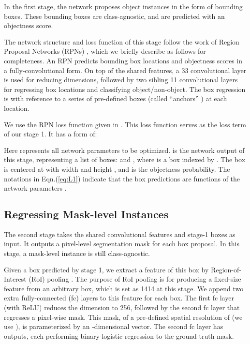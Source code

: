 \documentclass[10pt,twocolumn,letterpaper]{article}
\begin{document}
In the first stage, the network proposes object instances in the form of bounding boxes. These bounding boxes are class-agnostic, and are predicted with an objectness score.

The network structure and loss function of this stage follow the work of Region Proposal Networks (RPNs) \cite{Ren2015}, which we briefly describe as follows for completeness. An RPN predicts bounding box locations and objectness scores in a fully-convolutional form. On top of the shared features, a 33 convolutional layer is used for reducing dimensions, followed by two sibling 11 convolutional layers for regressing box locations and classifying object/non-object. The box regression is with reference to a series of pre-defined boxes (called ``anchors'' \cite{Ren2015}) at each location.

We use the RPN loss function given in \cite{Ren2015}. This loss function serves as the loss term  of our stage 1.
It has a form of:

Here  represents all network parameters to be optimized.  is the network output of this stage, representing a list of boxes:  and , where  is a box indexed by . The box  is centered at  with width  and height , and  is the objectness probability.
The notations in Eqn.(\ref{eq:L1}) indicate that the box predictions are functions of the network parameters .

\subsection{Regressing Mask-level Instances}

The second stage takes the shared convolutional features and stage-1 boxes as input. It outputs a pixel-level segmentation mask for each box proposal. In this stage, a mask-level instance is still class-agnostic.

Given a box predicted by stage 1, we extract a feature of this box by Region-of-Interest (RoI) pooling \cite{He2014,Girshick2015}.
The purpose of RoI pooling is for producing a fixed-size feature from an arbitrary box, which is set as 1414 at this stage.
We append two extra fully-connected (fc) layers to this feature for each box. The first fc layer (with ReLU) reduces the dimension to 256, followed by the second fc layer that regresses a pixel-wise mask. This mask, of a pre-defined spatial resolution of  (we use ), is parameterized by an -dimensional vector. The second fc layer has  outputs, each performing binary logistic regression to the ground truth mask.
\end{document}
